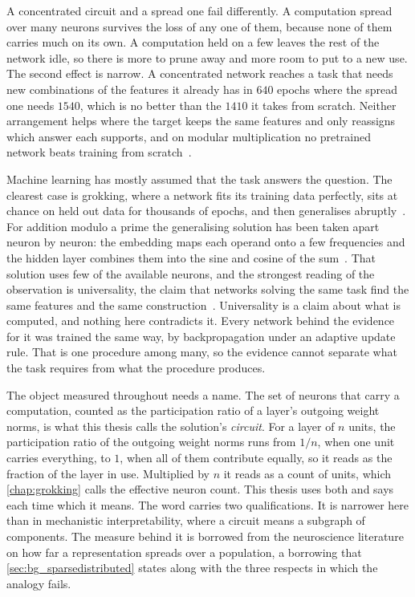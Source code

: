 A concentrated circuit and a spread one fail differently. A computation
spread over many neurons survives the loss of any one of them, because none of
them carries much on its own. A computation held
on a few leaves the rest of the network idle, so there is more to prune away
and more room to put to a new use. The second effect is narrow. A concentrated network reaches a task that needs new
combinations of the features it already has in $640$ epochs where the spread
one needs $1540$, which is no better than the $1410$ it takes from scratch.
Neither arrangement helps where the target keeps the same features and only
reassigns which answer each supports,
and on modular multiplication no pretrained network beats training from
scratch~\cite{sager_grokking_2026}.

Machine learning has mostly assumed that the task answers the question. The
clearest case is grokking, where a network fits its training data perfectly,
sits at chance on held out data for thousands of epochs, and then generalises
abruptly~\cite{power_grokking_2022}. For addition modulo a prime the
generalising solution has been taken apart neuron by neuron: the embedding
maps each operand onto a few frequencies and the hidden layer combines them
into the sine and cosine of the sum~\cite{nanda_progress_2023}. That solution
uses few of the available neurons, and the strongest reading of the
observation is universality, the claim that networks solving the same task
find the same features and the same construction~\cite{chughtai_toy_2023}.
Universality is a claim about what is computed, and nothing here contradicts
it. Every network behind the evidence for it was trained the same way, by
backpropagation under an adaptive update rule. That is one procedure among
many, so the evidence cannot separate what the task requires from what the
procedure produces.

The object measured throughout needs a name. The set of neurons that carry a
computation, counted as the participation ratio of a layer's outgoing weight
norms, is what this thesis calls the solution's \emph{circuit}. For a
layer of $n$ units, the participation ratio of the outgoing weight norms runs
from $1/n$, when one unit carries everything, to $1$, when all of them
contribute equally, so it reads as the fraction of the layer in use.
Multiplied by $n$ it reads as a count of units, which \cref{chap:grokking}
calls the effective neuron count. This thesis uses both and says each time
which it means. The word carries two qualifications. It is narrower here than
in mechanistic interpretability, where a circuit means a subgraph of
components. The measure behind it is borrowed from the neuroscience literature
on how far a representation spreads over a population, a borrowing that
\cref{sec:bg_sparsedistributed} states along with the three respects in which
the analogy fails.

